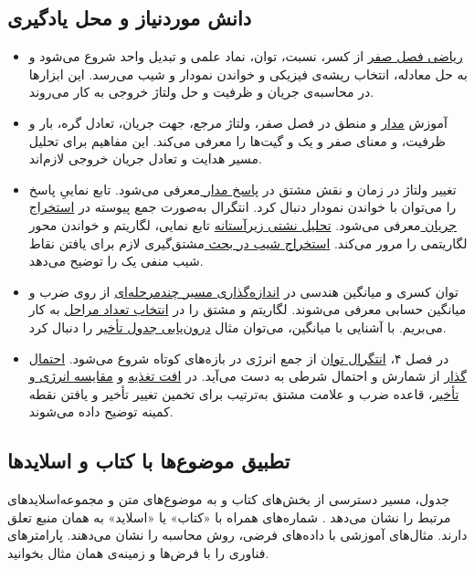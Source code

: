 \subsection*{دانش موردنیاز و محل یادگیری}
\begin{itemize}
  \item \hyperref[sec:foundation-math]{ریاضی فصل صفر} از کسر، نسبت، توان،
    نماد علمی و تبدیل واحد شروع می‌شود و به حل معادله، انتخاب ریشه‌ی
    فیزیکی و خواندن نمودار و شیب می‌رسد. این ابزارها در محاسبه‌ی جریان
    و ظرفیت و حل ولتاژ خروجی به کار می‌روند.
  \item آموزش \hyperref[sec:foundation-circuits]{مدار} و منطق در فصل صفر، ولتاژ مرجع،
    جهت جریان، تعادل گره، بار و ظرفیت، و معنای صفر و یک و گیت‌ها را
    معرفی می‌کند. این مفاهیم برای تحلیل مسیر هدایت و تعادل جریان
    خروجی لازم‌اند.
  \item تغییر ولتاژ در زمان و نقش مشتق در
    \hyperref[eq:foundation-rc-ode]{پاسخ مدار } معرفی می‌شود.
    تابع نماییِ پاسخ را می‌توان با خواندن نمودار دنبال کرد.
    انتگرال به‌صورت جمع پیوسته در
    \hyperref[sec:book-mos-current]{استخراج جریان }
    معرفی می‌شود. \hyperref[sec:subthreshold-leakage]{تحلیل نشتی زیرآستانه}
    تابع نمایی، لگاریتم و خواندن محور لگاریتمی را مرور می‌کند.
    \hyperref[sec:noise-derivatives]{استخراج شیب در بحث }
    مشتق‌گیری لازم برای یافتن نقاط شیب منفی یک را توضیح می‌دهد.
  \item توان کسری و میانگین هندسی در
    \hyperref[sec:delay-path-equal-effort]{اندازه‌گذاری مسیر چندمرحله‌ای}
    از روی ضرب و میانگین حسابی معرفی می‌شوند. لگاریتم و مشتق را در
    \hyperref[sec:delay-path-stage-count]{انتخاب تعداد مراحل} به کار می‌بریم.
    با آشنایی با میانگین، می‌توان مثال
    \hyperref[sec:delay-nldm]{درون‌یابی جدول تأخیر} را دنبال کرد.
  \item در فصل ۴، \hyperref[sec:power-average]{انتگرال توان} از جمع انرژی
    در بازه‌های کوتاه شروع می‌شود. \hyperref[sec:power-switching-probability]{احتمال
    گذار} از شمارش و احتمال شرطی به دست می‌آید. در
    \hyperref[sec:power-header-delay]{افت تغذیه} و
    \hyperref[sec:power-edp]{مقایسه انرژی و تأخیر}، قاعده ضرب و علامت مشتق
    به‌ترتیب برای تخمین تغییر تأخیر و یافتن نقطه کمینه توضیح داده می‌شوند.
\end{itemize}

\subsection*{تطبیق موضوع‌ها با کتاب و اسلایدها}
جدول، مسیر دسترسی از بخش‌های کتاب  و  به
موضوع‌های متن و مجموعه‌اسلایدهای مرتبط را نشان می‌دهد \cite{weste}.
شماره‌های همراه با «کتاب» یا «اسلاید» به همان منبع تعلق دارند.
مثال‌های آموزشی با داده‌های فرضی، روش محاسبه را نشان می‌دهند.
پارامترهای فناوری را با فرض‌ها و زمینه‌ی همان مثال بخوانید.

